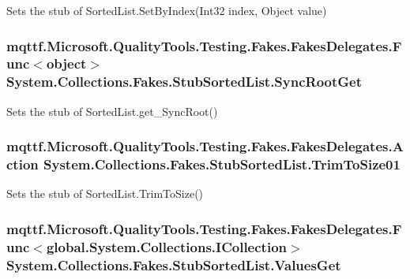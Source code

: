 Sets the stub of Sorted\-List.\-Set\-By\-Index(\-Int32 index, Object value)

\hypertarget{class_system_1_1_collections_1_1_fakes_1_1_stub_sorted_list_a3ab66093e997642c9a75494d5644f4d2}{
\subsubsection[{Sync\-Root\-Get}]{\setlength{\rightskip}{0pt plus 5cm}mqttf.\-Microsoft.\-Quality\-Tools.\-Testing.\-Fakes.\-Fakes\-Delegates.\-Func$<$object$>$ System.\-Collections.\-Fakes.\-Stub\-Sorted\-List.\-Sync\-Root\-Get}}\label{class_system_1_1_collections_1_1_fakes_1_1_stub_sorted_list_a3ab66093e997642c9a75494d5644f4d2}


Sets the stub of Sorted\-List.\-get\-\_\-\-Sync\-Root()

\hypertarget{class_system_1_1_collections_1_1_fakes_1_1_stub_sorted_list_a8c16d1269987886ff563330b3c59d4e0}{
\subsubsection[{Trim\-To\-Size01}]{\setlength{\rightskip}{0pt plus 5cm}mqttf.\-Microsoft.\-Quality\-Tools.\-Testing.\-Fakes.\-Fakes\-Delegates.\-Action System.\-Collections.\-Fakes.\-Stub\-Sorted\-List.\-Trim\-To\-Size01}}\label{class_system_1_1_collections_1_1_fakes_1_1_stub_sorted_list_a8c16d1269987886ff563330b3c59d4e0}


Sets the stub of Sorted\-List.\-Trim\-To\-Size()

\hypertarget{class_system_1_1_collections_1_1_fakes_1_1_stub_sorted_list_ae33b88e3ebc730ea958b6ff59eb956dd}{
\subsubsection[{Values\-Get}]{\setlength{\rightskip}{0pt plus 5cm}mqttf.\-Microsoft.\-Quality\-Tools.\-Testing.\-Fakes.\-Fakes\-Delegates.\-Func$<$global.\-System.\-Collections.\-I\-Collection$>$ System.\-Collections.\-Fakes.\-Stub\-Sorted\-List.\-Values\-Get}}\label{class_system_1_1_collections_1_1_fakes_1_1_stub_sorted_list_ae33b88e3ebc730ea958b6ff59eb956dd}


